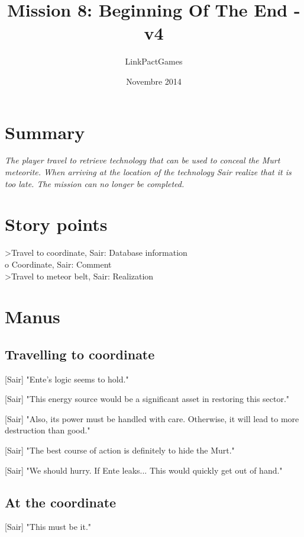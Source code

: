 \documentclass[a4paper,12pt]{article}
\begin{document}
\title{Mission 8: Beginning Of The End - v4}
\author{LinkPactGames}
\date{Novembre 2014}
\maketitle

\section{Summary}

\textit{The player travel to retrieve technology that can be used to conceal the Murt meteorite.
When arriving at the location of the technology Sair realize that it is too late. The mission can no
longer be completed.}

\section{Story points}

\textgreater Travel to coordinate, Sair: Database information\\
o Coordinate, Sair: Comment\\
\textgreater Travel to meteor belt, Sair: Realization

\section{Manus}

\subsection{Travelling to coordinate}

[Sair] "Ente's logic seems to hold." 

[Sair] "This energy source would be a significant asset in restoring this sector."

[Sair] "Also, its power must be handled with care. Otherwise, it will lead to more destruction than good."

[Sair] "The best course of action is definitely to hide the Murt."

[Sair] "We should hurry. If Ente leaks... This would quickly get out of hand."

\subsection{At the coordinate}

[Sair] "This must be it."
\end{document}
